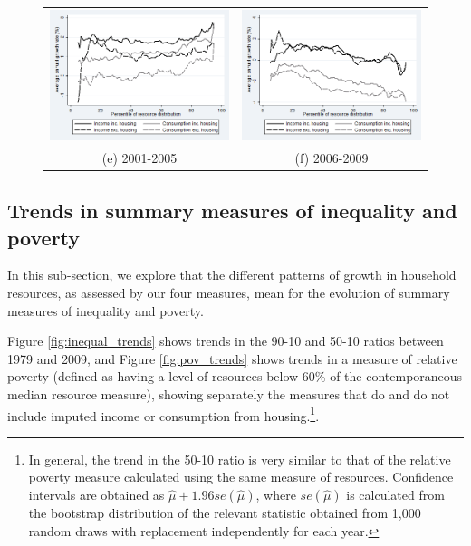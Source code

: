 \begin{figure}
\begin{tabular}{cc}
\includegraphics[width=.5\linewidth]{pictures/gic_5.png} & \includegraphics[width=.5\linewidth]{pictures/gic_6.png} \\
(e) 2001-2005 & (f) 2006-2009
\end{tabular}
\label{fig:gicsub}
\end{figure}




\subsection{Trends in summary measures of inequality and poverty}

In this sub-section, we explore that the different patterns of growth in household resources, as assessed by our four measures, mean for the evolution of summary measures of inequality and poverty.


Figure \ref{fig:inequal_trends} shows trends in the 90-10 and 50-10 ratios between 1979 and 2009, and Figure \ref{fig:pov_trends} shows trends in a measure of relative poverty (defined as having a level of resources below 60\% of the contemporaneous median resource measure), showing separately the measures that do and do not include imputed income or consumption from housing.\footnote{In general, the trend in the 50-10 ratio is very similar to that of the relative poverty measure calculated using the same measure of resources. Confidence intervals are obtained as $\hat{\mu} + 1.96se(\hat{\mu})$, where $se(\hat{\mu})$ is calculated from the bootstrap distribution of the relevant statistic obtained from 1,000 random draws with replacement independently for each year.}.

